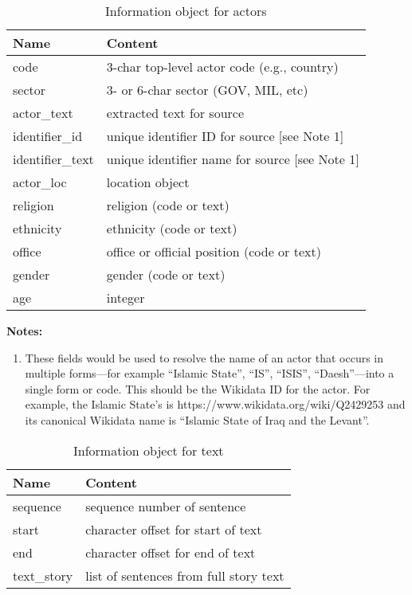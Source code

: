\documentclass[11pt]{report}
\begin{document}
\begin{table}[htp]
\caption{Information object for actors }
\begin{center}
\begin{tabular}{|l|l|}
\hline
Name & Content \\
\hline
code & 3-char top-level actor code (e.g., country)\\
sector & 3- or 6-char sector (GOV, MIL, etc)\\
actor\_text & extracted text for source \\
identifier\_id & unique identifier ID for source [see Note 1]\\
identifier\_text & unique identifier name for source [see Note 1]\\
actor\_loc & location object\\
religion & religion (code or text) \\
ethnicity & ethnicity (code or text) \\
office & office or official position (code or text) \\
gender & gender (code or text) \\
age & integer \\
\hline
\end{tabular}
\end{center}
\label{tab:actorinfo}
\noindent \textbf{Notes:}
\begin{enumerate}
\item These fields would be used to resolve the name of an actor that occurs in multiple forms---for example ``Islamic State'', ``IS'', ``ISIS'', ``Daesh''---into a single form or code. This should be the Wikidata ID for the actor. For example, the Islamic State's is https://www.wikidata.org/wiki/Q2429253 and its canonical Wikidata name is ``Islamic State of Iraq and the Levant''.
\end{enumerate}
\end{table}%

\begin{table}[htp]
\caption{Information object for text }
\begin{center}
\begin{tabular}{|l|l|}
\hline
Name & Content \\
\hline
sequence & sequence number of sentence \\
start & character offset for start of text  \\
end &  character offset for end of text   \\
text\_story & list of sentences from full story text \\
\hline
\end{tabular}
\end{center}
\label{tab:textinfo}
\end{table}%
\end{document}
